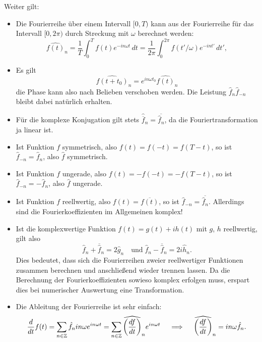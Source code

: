 Weiter gilt:
\begin{itemize}
\item Die Fourierreihe über einem Intervall $[0,T)$ kann aus der
  Fourierreihe für das Intervall $[0,2\pi)$ durch Streckung mit
  $\omega$ berechnet werden:
  \begin{equation}
    \widehat{f(t)}_n = \frac{1}{T}\int_0^T f(t)e^{-i n\omega t}\, dt
    = \frac{1}{2\pi}\int_0^{2\pi} f(t'/\omega)e^{-i n t'}\, dt',
  \end{equation}
\item Es gilt
  \begin{equation}
    \widehat{f(t + t_0)}_{n} = e^{i n \omega t_0} \widehat{f(t)}_{n}
  \end{equation}
  die Phase kann also nach Belieben verschoben werden. Die Leistung
  $\hat{f}_{n}\hat{f}_{-n}$ bleibt dabei natürlich erhalten.
\item Für die komplexe Konjugation gilt stets
  $\widehat{\overline{f}}_n = \overline{\hat{f}_n}$, da die
  Fouriertransformation ja linear ist.
\item Ist Funktion $f$ symmetrisch, also $f(t) = f(-t) = f(T-t)$, so ist
  $\hat{f}_{-n} = \hat{f}_n$, also $\hat{f}$ symmetrisch.
\item Ist Funktion $f$ ungerade, also $f(t) = -f(-t) = -f(T-t)$, so ist
  $\hat{f}_{-n} = -\hat{f}_n$, also $\hat{f}$ ungerade.
\item Ist Funktion $f$ reellwertig, also $f(t) = \overline{f(t)}$, so
  ist $\hat{f}_{-n} = \overline{\hat{f}_n}$. Allerdings sind die
  Fourierkoeffizienten im Allgemeinen komplex!
\item 
  Ist die komplexwertige Funktion $f(t)=g(t) + ih(t)$ mit $g$, $h$
  reellwertig, gilt also
  \begin{equation}
    \hat{f}_{n}  + \overline{\hat{f}}_{n} = 2\widehat{g}_{n}
    \quad\text{und}\;
    \hat{f}_{n}  - \overline{\hat{f}}_{n} = 2i\widehat{h}_{n}.
  \end{equation}
  Dies bedeutet, dass sich die Fourierreihen zweier reellwertiger
  Funktionen zusammen berechnen und anschließend wieder trennen
  lassen. Da die Berechnung der Fourierkoeffizienten sowieso komplex
  erfolgen muss, erspart dies bei numerischer Auswertung eine
  Transformation.
\item Die Ableitung der Fourierreihe ist sehr einfach:
  \begin{equation}
    \frac{d}{dt}  f(t) = \sum_{n\in\mathbb{Z}} \hat{f}_n i n\omega e^{i n\omega
      t} = \sum_{n\in\mathbb{Z}} \widehat{\left(\frac{df}{dt}\right)}_n e^{i n\omega
      t}\quad\implies\quad \widehat{\left(\frac{df}{dt}\right)}_n= i
    n\omega\hat{f}_n.
    \label{eq:dfft}
  \end{equation}
\end{itemize}

